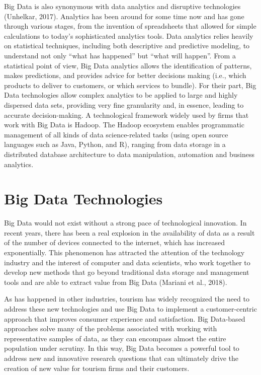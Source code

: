 \documentclass[
  letterpaper,
  DIV=11,
  numbers=noendperiod]{scrreprt}
\begin{document}
Big Data is also synonymous with data analytics and disruptive
technologies (Unhelkar, 2017). Analytics has been around for some time
now and has gone through various stages, from the invention of
spreadsheets that allowed for simple calculations to today's
sophisticated analytics tools. Data analytics relies heavily on
statistical techniques, including both descriptive and predictive
modeling, to understand not only ``what has happened'' but ``what will
happen''. From a statistical point of view, Big Data analytics allows
the identification of patterns, makes predictions, and provides advice
for better decisions making (i.e., which products to deliver to
customers, or which services to bundle). For their part, Big Data
technologies allow complex analytics to be applied to large and highly
dispersed data sets, providing very fine granularity and, in essence,
leading to accurate decision-making. A technological framework widely
used by firms that work with Big Data is Hadoop. The Hadoop ecosystem
enables programmatic management of all kinds of data science-related
tasks (using open source languages such as Java, Python, and R), ranging
from data storage in a distributed database architecture to data
manipulation, automation and business analytics.

\hypertarget{big-data-technologies}{%
\section{Big Data Technologies}\label{big-data-technologies}}

Big Data would not exist without a strong pace of technological
innovation. In recent years, there has been a real explosion in the
availability of data as a result of the number of devices connected to
the internet, which has increased exponentially. This phenomenon has
attracted the attention of the technology industry and the interest of
computer and data scientists, who work together to develop new methods
that go beyond traditional data storage and management tools and are
able to extract value from Big Data (Mariani et al., 2018).

As has happened in other industries, tourism has widely recognized the
need to address these new technologies and use Big Data to implement a
customer-centric approach that improves consumer experience and
satisfaction. Big Data-based approaches solve many of the problems
associated with working with representative samples of data, as they can
encompass almost the entire population under scrutiny. In this way, Big
Data becomes a powerful tool to address new and innovative research
questions that can ultimately drive the creation of new value for
tourism firms and their customers.
\end{document}

